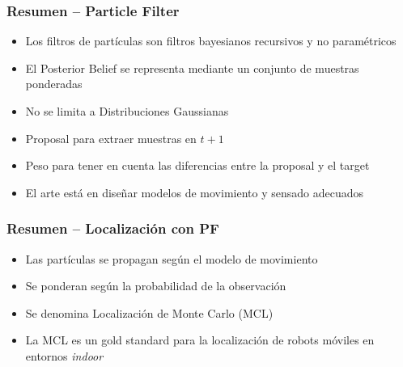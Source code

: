 \begin{frame}
    \frametitle{Resumen – Particle Filter}

    \begin{itemize}
        \item Los filtros de partículas son filtros bayesianos recursivos y no paramétricos
        \item El Posterior Belief se representa mediante un conjunto de muestras ponderadas
        \item No se limita a Distribuciones Gaussianas
        \item Proposal para extraer muestras en $t+1$
        \item Peso para tener en cuenta las diferencias entre la proposal y el target
        \item El arte está en diseñar modelos de movimiento y sensado adecuados
    \end{itemize}
\end{frame}
    
\begin{frame}
    \frametitle{Resumen – Localización con PF}

    \begin{itemize}
        \item Las partículas se propagan según el modelo de movimiento
        \item Se ponderan según la probabilidad de la observación
        \item Se denomina Localización de Monte Carlo (MCL)
        \item La MCL es un gold standard para la localización de robots móviles en entornos \emph{indoor}
    \end{itemize}
\end{frame}